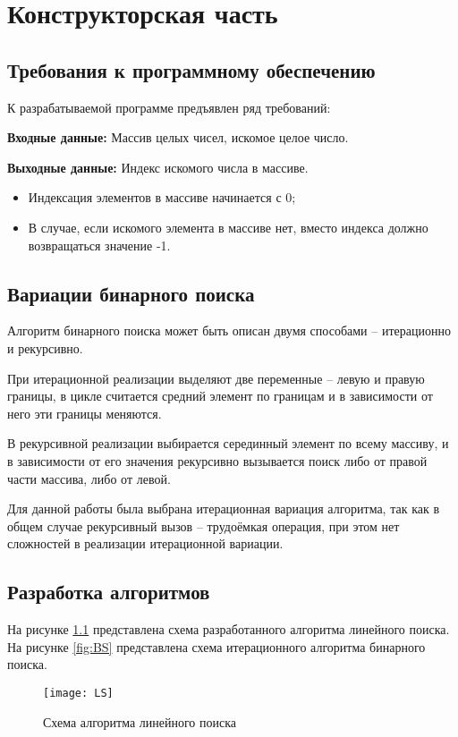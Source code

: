 \chapter{Конструкторская часть}

\section{Требования к программному обеспечению}

К разрабатываемой программе предъявлен ряд требований:

\textbf{Входные данные:} Массив целых чисел, искомое целое число.

\textbf{Выходные данные:} Индекс искомого числа в массиве.

\begin{itemize}
	\item Индексация элементов в массиве начинается с 0;
	\item В случае, если искомого элемента в массиве нет, вместо индекса должно возвращаться значение -1.
\end{itemize}


\section{Вариации бинарного поиска}
Алгоритм бинарного поиска может быть описан двумя способами – итерационно и рекурсивно.

При итерационной реализации выделяют две переменные – левую и правую границы, в цикле считается средний элемент по границам и в зависимости от него эти границы меняются.

В рекурсивной реализации выбирается серединный элемент по всему массиву, и в зависимости от его значения рекурсивно вызывается поиск либо от правой части массива, либо от левой.

Для данной работы была выбрана итерационная вариация алгоритма, так как в общем случае рекурсивный вызов – трудоёмкая операция, при этом нет сложностей в реализации итерационной вариации.
\section{Разработка алгоритмов}
На рисунке \ref{fig:LS} представлена схема разработанного алгоритма линейного поиска. На рисунке \ref{fig:BS} представлена схема итерационного алгоритма бинарного поиска.


\begin{figure}[h]
	\centering
	\texttt{[image: LS]}
	\caption{Схема алгоритма линейного поиска}
	\label{fig:LS}
\end{figure}


